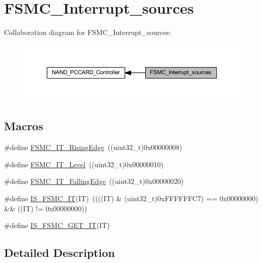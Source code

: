 \hypertarget{group___f_s_m_c___interrupt__sources}{}\section{F\+S\+M\+C\+\_\+\+Interrupt\+\_\+sources}
\label{group___f_s_m_c___interrupt__sources}
Collaboration diagram for F\+S\+M\+C\+\_\+\+Interrupt\+\_\+sources\+:
\nopagebreak
\begin{figure}[H]
\begin{center}
\leavevmode
\includegraphics[width=350pt]{group___f_s_m_c___interrupt__sources}
\end{center}
\end{figure}
\subsection*{Macros}
\begin{DoxyCompactItemize}
\item 
\#define \hyperlink{group___f_s_m_c___interrupt__sources_gac483854bd6f90d8c7899a597a0c0ab1a}{F\+S\+M\+C\+\_\+\+I\+T\+\_\+\+Rising\+Edge}~((uint32\+\_\+t)0x00000008)
\item 
\#define \hyperlink{group___f_s_m_c___interrupt__sources_ga59b5839854074008fb36fa86ec50a0c7}{F\+S\+M\+C\+\_\+\+I\+T\+\_\+\+Level}~((uint32\+\_\+t)0x00000010)
\item 
\#define \hyperlink{group___f_s_m_c___interrupt__sources_ga8e4b9589c9981c900b5f2e84581a9693}{F\+S\+M\+C\+\_\+\+I\+T\+\_\+\+Falling\+Edge}~((uint32\+\_\+t)0x00000020)
\item 
\#define \hyperlink{group___f_s_m_c___interrupt__sources_ga40a38f097a75f27a700e626905fa9a38}{I\+S\+\_\+\+F\+S\+M\+C\+\_\+\+IT}(IT)~((((IT) \& (uint32\+\_\+t)0x\+F\+F\+F\+F\+F\+F\+C7) == 0x00000000) \&\& ((\+I\+T) != 0x00000000))
\item 
\#define \hyperlink{group___f_s_m_c___interrupt__sources_gae2a57d0b15e025212489ec1421ff245d}{I\+S\+\_\+\+F\+S\+M\+C\+\_\+\+G\+E\+T\+\_\+\+IT}(IT)
\end{DoxyCompactItemize}


\subsection{Detailed Description}


